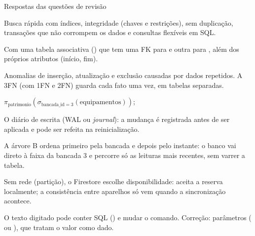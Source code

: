\documentclass[aspectratio=169,10pt]{beamer}
\begin{document}
\begin{frame}{Respostas das questões de revisão}
  \begin{respostas}
    \item Busca rápida com índices, integridade (chaves e restrições), sem duplicação, transações que não corrompem os dados e consultas flexíveis em SQL.
    \item Com uma tabela associativa () que tem uma FK para  e outra para , além dos próprios atributos (início, fim).
    \item Anomalias de inserção, atualização e exclusão causadas por dados repetidos. A 3FN (com 1FN e 2FN) guarda cada fato uma vez, em tabelas separadas.
    \item $\pi_{\text{patrimonio}}(\sigma_{\text{bancada\_id}=3}(\text{equipamentos}))$; 
    \item O diário de escrita (WAL ou \emph{journal}): a mudança é registrada antes de ser aplicada e pode ser refeita na reinicialização.
    \item A árvore B ordena primeiro pela bancada e depois pelo instante: o banco vai direto à faixa da bancada 3 e percorre só as leituras mais recentes, sem varrer a tabela.
    \item Sem rede (partição), o Firestore escolhe disponibilidade: aceita a reserva localmente; a consistência entre aparelhos só vem quando a sincronização acontece.
    \item O texto digitado pode conter SQL () e mudar o comando. Correção: parâmetros ( ou ), que tratam o valor como dado.
  \end{respostas}
\end{frame}

\end{document}
